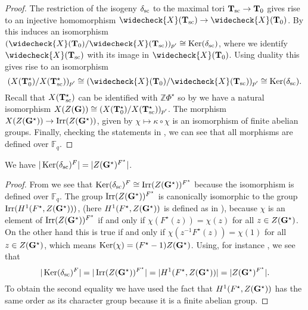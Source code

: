 \documentclass[eqthmnum]{jt-calcs}
\renewcommand{\cref}{\Cref}
\begin{document}
\begin{proof}
The restriction of the isogeny $\delta_{\operatorname{sc}}$ to the maximal tori $\mathbf{T}_{\operatorname{sc}} \to \mathbf{T}_0$ gives rise to an injective homomorphism $\widecheck{X}(\bT_{\simc}) \to \widecheck{X}(\bT_0)$. By \cite[Proposition 1.11]{bonnafe:2006:sln} this induces an isomorphism $(\widecheck{X}(\bT_0)/\widecheck{X}(\bT_{\simc}))_{p'} \cong \Ker(\delta_{\simc})$, where we identify $\widecheck{X}(\bT_{\simc})$ with its image in $\widecheck{X}(\bT_0)$. Using duality this gives rise to an isomorphism
\begin{equation*}
(X(\bT_0^{\star})/X(\bT_{\simc}^{\star}))_{p'} \cong (\widecheck{X}(\bT_0)/\widecheck{X}(\bT_{\simc}))_{p'} \cong \Ker(\delta_{\simc}).
\end{equation*}
Recall that $X(\mathbf{T}_{\operatorname{sc}}^{\star})$ can be identified with $\mathbb{Z}\Phi^{\star}$ so by \cite[Proposition 4.1]{bonnafe:2006:sln} we have a natural isomorphism $X(Z(\mathbf{G})) \cong (X(\mathbf{T}_0^{\star})/X(\mathbf{T}_{\operatorname{sc}}^{\star}))_{p'}$. The morphism $X(Z(\mathbf{G}^{\star})) \to \operatorname{Irr}(Z(\mathbf{G}^{\star}))$, given by $\chi \mapsto \kappa \circ \chi$ is an isomorphism of finite abelian groups. Finally, checking the statements in \cite{bonnafe:2006:sln}, we can see that all morphisms are defined over $\mathbb{F}_q$.
\end{proof}

\begin{cor}\label{cor:centre-duality}
We have $|\operatorname{Ker}(\delta_{\operatorname{sc}})^F| = |Z(\mathbf{G}^{\star})^{F^{\star}}|$.
\end{cor}

\begin{proof}
From \cref{lem:Z(G)-ker} we see that $\operatorname{Ker}(\delta_{\operatorname{sc}})^F \cong \operatorname{Irr}(Z(\mathbf{G}^{\star}))^{F^{\star}}$ because the isomorphism is defined over $\mathbb{F}_q$. The group $\operatorname{Irr}(Z(\mathbf{G}^{\star}))^{F^{\star}}$ is canonically isomorphic to the group $\operatorname{Irr}(H^1(F^{\star},Z(\mathbf{G}^{\star})))$, (here $H^1(F^{\star},Z(\mathbf{G}^{\star}))$ is defined as in \cite[\S1.B]{bonnafe:2006:sln}), because $\chi$ is an element of $\operatorname{Irr}(Z(\mathbf{G}^{\star}))^{F^{\star}}$ if and only if $\chi(F^{\star}(z)) = \chi(z)$ for all $z \in Z(\mathbf{G}^{\star})$. On the other hand this is true if and only if $\chi(z^{-1}F^{\star}(z)) = \chi(1)$ for all $z \in Z(\mathbf{G}^{\star})$, which means $\operatorname{Ker}(\chi) = (F^{\star}-1)Z(\mathbf{G}^{\star})$. Using, for instance \cite[Exemple 1.1]{bonnafe:2005:quasi-isolated}, we see that
\begin{equation*}
|\operatorname{Ker}(\delta_{\operatorname{sc}})^F| = |\operatorname{Irr}(Z(\mathbf{G}^{\star}))^{F^{\star}}| = |H^1(F^{\star},Z(\mathbf{G}^{\star}))| = |Z(\mathbf{G}^{\star})^{F^{\star}}|.
\end{equation*}
To obtain the second equality we have used the fact that $H^1(F^{\star},Z(\mathbf{G}^{\star}))$ has the same order as its character group because it is a finite abelian group.
\end{proof}
\end{document}
